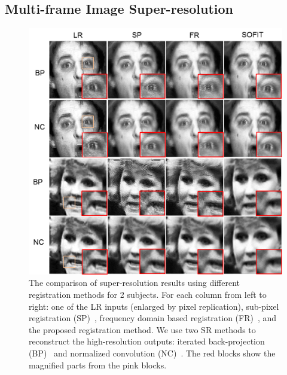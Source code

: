 \documentclass[10pt,journal]{IEEEtran}
\begin{document}
\subsection{Multi-frame Image Super-resolution}

\begin{figure}[t]
	\centering
		\includegraphics[width=\columnwidth]{fig/superResolution.png}
	\caption{The comparison of super-resolution results using different registration methods for 2 subjects. For each column from left to right: one of the LR inputs (enlarged by pixel replication), sub-pixel registration (SP)~\cite{Keren_CVPR88}, frequency domain based registration (FR)~\cite{Vandewalle06}, and the proposed registration method. We use two SR methods to reconstruct the high-resolution outputs: iterated back-projection (BP)~\cite{Irani91} and normalized convolution (NC)~\cite{Pham_06}. The red blocks show the magnified parts from the pink blocks.}
	\label{fig:superResolution}
\end{figure}
\end{document}
